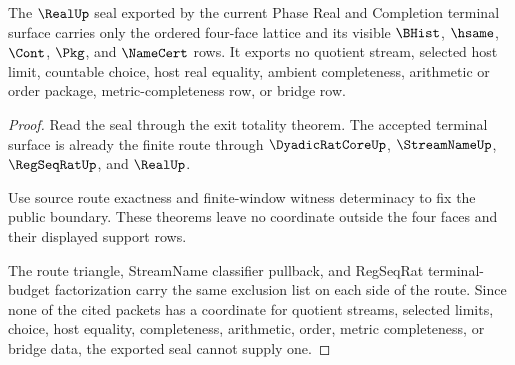 \begin{theorem}
\label{thm:real-l10-dependency-lattice-seal-nonescape}
The $\RealUp$ seal exported by the current Phase Real and Completion terminal surface carries only the ordered four-face lattice and its visible $\BHist$, $\hsame$, $\Cont$, $\Pkg$, and $\NameCert$ rows. It exports no quotient stream, selected host limit, countable choice, host real equality, ambient completeness, arithmetic or order package, metric-completeness row, or bridge row.
\end{theorem}
\begin{proof}
Read the seal through the exit totality theorem. The accepted terminal surface is already the finite route through $\DyadicRatCoreUp$, $\StreamNameUp$, $\RegSeqRatUp$, and $\RealUp$.

Use source route exactness and finite-window witness determinacy to fix the public boundary. These theorems leave no coordinate outside the four faces and their displayed support rows.

The route triangle, StreamName classifier pullback, and RegSeqRat terminal-budget factorization carry the same exclusion list on each side of the route. Since none of the cited packets has a coordinate for quotient streams, selected limits, choice, host equality, completeness, arithmetic, order, metric completeness, or bridge data, the exported seal cannot supply one.
\end{proof}
